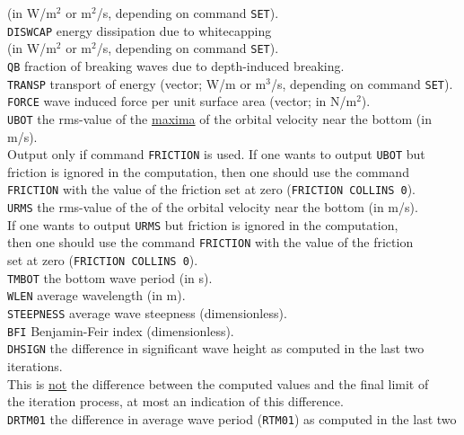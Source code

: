 \documentclass[12pt]{book}
\begin{document}
\begin{tabbing}
                (in W/m$^2$ or m$^2$/s, depending on command {\tt SET}).\-\\
{\tt DISWCAP} \> energy dissipation due to whitecapping\+\\
                (in W/m$^2$ or m$^2$/s, depending on command {\tt SET}).\-\\
{\tt QB}     \> fraction of breaking waves due to depth-induced breaking.\\
{\tt TRANSP} \> transport of energy (vector; W/m or m$^3$/s, depending on command {\tt SET}).\\
{\tt FORCE}  \> wave induced force per unit surface area (vector; in N/m$^2$).\\
{\tt UBOT}   \> the rms-value of the \underline{maxima} of the orbital velocity near the bottom (in m/s).\+\\
                Output only if command {\tt FRICTION} is used. If one wants to output {\tt UBOT} but\\
                friction is ignored in the computation, then one should use the command\\
                {\tt FRICTION} with the value of the friction set at zero ({\tt FRICTION COLLINS 0}).\-\\
{\tt URMS}   \> the rms-value of the of the orbital velocity near the bottom (in m/s).\+\\
                If one wants to output {\tt URMS} but friction is ignored in the computation,\\
                then one should use the command {\tt FRICTION} with the value of the friction\\
                set at zero ({\tt FRICTION COLLINS 0}).\-\\
{\tt TMBOT}  \> the bottom wave period (in s).\\
{\tt WLEN}   \> average wavelength (in m).\\
{\tt STEEPNESS} \> average wave steepness (dimensionless).\\
{\tt BFI}    \> Benjamin-Feir index (dimensionless).\\
{\tt DHSIGN} \> the difference in significant wave height as computed in the last two iterations.\+\\
                This is \underline{not} the difference between the computed values and the final limit of\\
                the iteration process, at most an indication of this difference.\-\\
{\tt DRTM01} \> the difference in average wave period ({\tt RTM01}) as computed in the last two\+\\

\end{tabbing}
\end{document}
